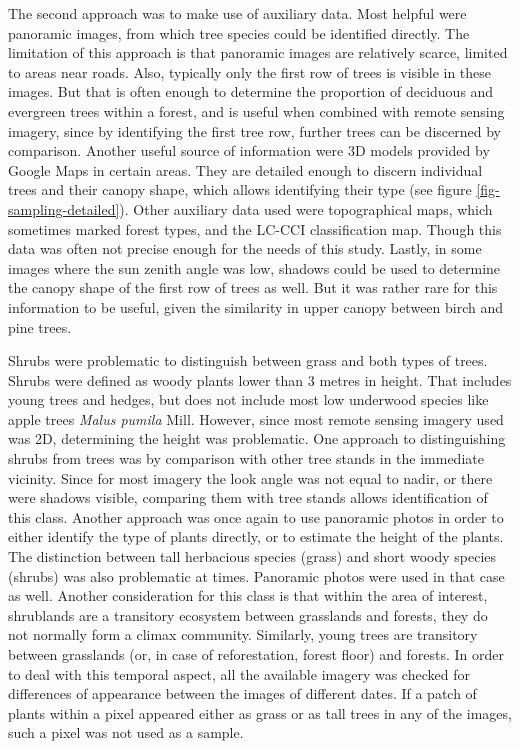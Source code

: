 \documentclass[a4paper,10pt]{book}
\begin{document}
The second approach was to make use of auxiliary data. Most helpful were panoramic images, from which tree species could be identified directly. The limitation of this approach is that panoramic images are relatively scarce, limited to areas near roads. Also, typically only the first row of trees is visible in these images. But that is often enough to determine the proportion of deciduous and evergreen trees within a forest, and is useful when combined with remote sensing imagery, since by identifying the first tree row, further trees can be discerned by comparison. Another useful source of information were 3D models provided by Google Maps in certain areas. They are detailed enough to discern individual trees and their canopy shape, which allows identifying their type (see figure \ref{fig-sampling-detailed}). Other auxiliary data used were topographical maps, which sometimes marked forest types, and the LC-CCI classification map. Though this data was often not precise enough for the needs of this study. Lastly, in some images where the sun zenith angle was low, shadows could be used to determine the canopy shape of the first row of trees as well. But it was rather rare for this information to be useful, given the similarity in upper canopy between birch and pine trees.

Shrubs were problematic to distinguish between grass and both types of trees. Shrubs were defined as woody plants lower than 3 metres in height. That includes young trees and hedges, but does not include most low underwood species like apple trees \textit{Malus pumila} Mill. However, since most remote sensing imagery used was 2D, determining the height was problematic. One approach to distinguishing shrubs from trees was by comparison with other tree stands in the immediate vicinity. Since for most imagery the look angle was not equal to nadir, or there were shadows visible, comparing them with tree stands allows identification of this class. Another approach was once again to use panoramic photos in order to either identify the type of plants directly, or to estimate the height of the plants. The distinction between tall herbacious species (grass) and short woody species (shrubs) was also problematic at times. Panoramic photos were used in that case as well. Another consideration for this class is that within the area of interest, shrublands are a transitory ecosystem between grasslands and forests, they do not normally form a climax community. Similarly, young trees are transitory between grasslands (or, in case of reforestation, forest floor) and forests. In order to deal with this temporal aspect, all the available imagery was checked for differences of appearance between the images of different dates. If a patch of plants within a pixel appeared either as grass or as tall trees in any of the images, such a pixel was not used as a sample.
\end{document}
